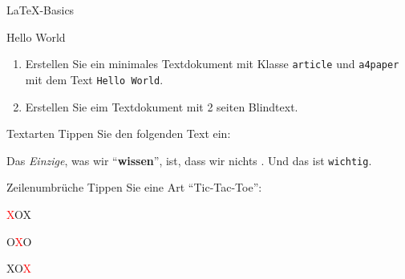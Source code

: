 \documentclass[
    inlineshortcut=java, %
    corporatedesign, %
    boxarc, %
]{algoexercise}
\begin{document}
    \begin{task}[points=auto]{\LaTeX-Basics}
        \begin{subtask*}[points=2]{Hello World}
            \begin{enumerate}
                \item Erstellen Sie ein minimales Textdokument mit Klasse \texttt{article} und \texttt{a4paper} mit dem Text \verb+Hello World+.
                \item Erstellen Sie eim Textdokument mit 2 seiten Blindtext.
            \end{enumerate}
        \end{subtask*}
        \vspace{-2em}
        \begin{subtask*}[points=1]{Textarten}
            Tippen Sie den folgenden Text ein:

            \begin{grayInfoBox}
                \Large Das \emph{Einzige}, \large was wir \enquote{\textbf{wissen}}, ist, \normalsize dass wir \textcolor{\IfDarkModeTF{cyan}{blue}}{nichts} . \small Und das ist \texttt{wichtig}.
            \end{grayInfoBox}
        \end{subtask*}
        \begin{subtask*}[points=1]{Zeilenumbrüche}
            Tippen Sie eine Art \enquote{Tic-Tac-Toe}:

            \begin{grayInfoBox}[fontupper=\setlength{\parskip}{0cm}\setlength{\parindent}{0em}, center upper]
                \textcolor{red}{X}\hspace{1cm}O\hspace{1cm}X

                \vspace{1cm}O\hspace{1cm}\textcolor{red}{X}\hspace{1cm}O

                \vspace{1cm}X\hspace{1cm}O\hspace{1cm}\textcolor{red}{X}
            \end{grayInfoBox}


\end{subtask*}
\end{task}
\end{document}
